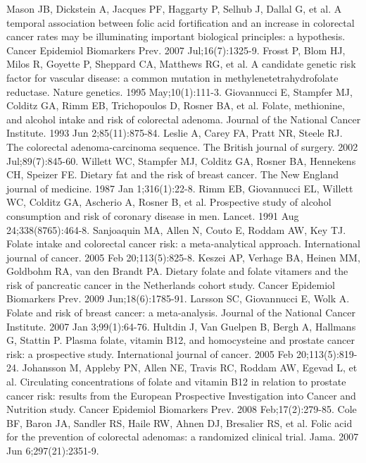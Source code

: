\begin{thebibliography}{12}
		Mason JB, Dickstein A, Jacques PF, Haggarty P, Selhub J, Dallal G, et al. A temporal association between folic acid fortification and an increase in colorectal cancer rates may be illuminating important biological principles: a hypothesis. Cancer Epidemiol Biomarkers Prev. 2007 Jul;16(7):1325-9. 
		Frosst P, Blom HJ, Milos R, Goyette P, Sheppard CA, Matthews RG, et al. A candidate genetic risk factor for vascular disease: a common mutation in methylenetetrahydrofolate reductase. Nature genetics. 1995 May;10(1):111-3. 
		Giovannucci E, Stampfer MJ, Colditz GA, Rimm EB, Trichopoulos D, Rosner BA, et al. Folate, methionine, and alcohol intake and risk of colorectal adenoma. Journal of the National Cancer Institute. 1993 Jun 2;85(11):875-84. 
		Leslie A, Carey FA, Pratt NR, Steele RJ. The colorectal adenoma-carcinoma sequence. The British journal of surgery. 2002 Jul;89(7):845-60. 
		Willett WC, Stampfer MJ, Colditz GA, Rosner BA, Hennekens CH, Speizer FE. Dietary fat and the risk of breast cancer. The New England journal of medicine. 1987 Jan 1;316(1):22-8. 
		Rimm EB, Giovannucci EL, Willett WC, Colditz GA, Ascherio A, Rosner B, et al. Prospective study of alcohol consumption and risk of coronary disease in men. Lancet. 1991 Aug 24;338(8765):464-8. 
		Sanjoaquin MA, Allen N, Couto E, Roddam AW, Key TJ. Folate intake and colorectal cancer risk: a meta-analytical approach. International journal of cancer. 2005 Feb 20;113(5):825-8. 
		Keszei AP, Verhage BA, Heinen MM, Goldbohm RA, van den Brandt PA. Dietary folate and folate vitamers and the risk of pancreatic cancer in the Netherlands cohort study. Cancer Epidemiol Biomarkers Prev. 2009 Jun;18(6):1785-91. 
		Larsson SC, Giovannucci E, Wolk A. Folate and risk of breast cancer: a meta-analysis. Journal of the National Cancer Institute. 2007 Jan 3;99(1):64-76. 
		Hultdin J, Van Guelpen B, Bergh A, Hallmans G, Stattin P. Plasma folate, vitamin B12, and homocysteine and prostate cancer risk: a prospective study. International journal of cancer. 2005 Feb 20;113(5):819-24. 
		Johansson M, Appleby PN, Allen NE, Travis RC, Roddam AW, Egevad L, et al. Circulating concentrations of folate and vitamin B12 in relation to prostate cancer risk: results from the European Prospective Investigation into Cancer and Nutrition study. Cancer Epidemiol Biomarkers Prev. 2008 Feb;17(2):279-85. 
		Cole BF, Baron JA, Sandler RS, Haile RW, Ahnen DJ, Bresalier RS, et al. Folic acid for the prevention of colorectal adenomas: a randomized clinical trial. Jama. 2007 Jun 6;297(21):2351-9. 

\end{thebibliography}
